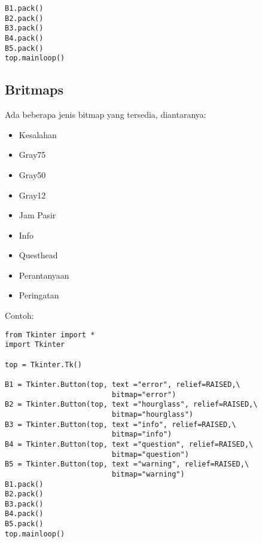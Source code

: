\documentclass [12pt,a4paper,notitlepage,oneside,bahasa]{article}
\begin{document}
\begin{enumerate}
\begin{itemize}
\begin{verbatim}
B1.pack()
B2.pack()
B3.pack()
B4.pack()
B5.pack()
top.mainloop()
\end{verbatim}

\noindent 
\subsection{Britmaps}
\noindent 
Ada beberapa jenis bitmap yang tersedia, diantaranya: \par
\noindent 
\begin{itemize}
	\item Kesalahan
	\item Gray75 
	\item Gray50 
	\item Gray12
	\item Jam Pasir 
	\item Info 
	\item Questhead
	\item Perantanyaan
	\item Peringatan
\end{itemize}

\vspace{12pt}
Contoh: \par
\begin{verbatim}
from Tkinter import *
import Tkinter

top = Tkinter.Tk()

B1 = Tkinter.Button(top, text ="error", relief=RAISED,\
                         bitmap="error")
B2 = Tkinter.Button(top, text ="hourglass", relief=RAISED,\
                         bitmap="hourglass")
B3 = Tkinter.Button(top, text ="info", relief=RAISED,\
                         bitmap="info")
B4 = Tkinter.Button(top, text ="question", relief=RAISED,\
                         bitmap="question")
B5 = Tkinter.Button(top, text ="warning", relief=RAISED,\
                         bitmap="warning")
B1.pack()
B2.pack()
B3.pack()
B4.pack()
B5.pack()
top.mainloop()
\end{verbatim}

\noindent 

\end{itemize}
\end{enumerate}
\end{document}
